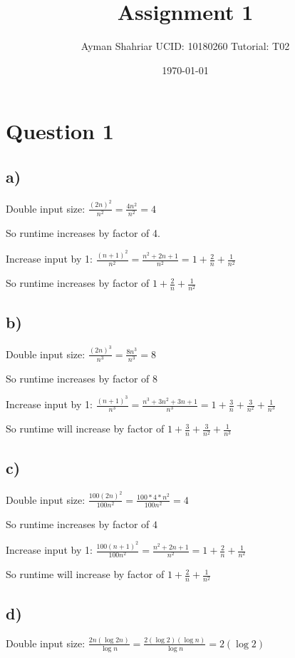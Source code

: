 \documentclass{article}
\title{Assignment 1}
\author{Ayman Shahriar \;\; UCID: 10180260 \;\;  Tutorial: T02 }
\date{\today}
\begin{document}
\maketitle

\raggedright

\setlength{\parskip}{0.8em}  %

\section*{Question 1}

\subsection*{a)}
Double input size: $\frac{(2n)^2}{n^2} = \frac{4n^2}{n^2} = 4$

So runtime increases by factor of 4.

Increase input by 1: $\frac{(n+1)^2}{n^2} = \frac{n^2+2n+1}{n^2} = 1+\frac{2}{n}+\frac{1}{n^2}$

So runtime increases by factor of $1+\frac{2}{n}+\frac{1}{n^2}$


\subsection*{b)}
Double input size: $\frac{(2n)^3}{n^3} = \frac{8n^3}{n^3} = 8$

So runtime increases by factor of $8$

Increase input by 1: $\frac{(n+1)^3}{n^3} = \frac{n^3+3n^2+3n+1}{n^3} = 1+\frac{3}{n} + \frac{3}{n^2} + \frac{1}{n^3}$

So runtime will increase by factor of $1+\frac{3}{n} + \frac{3}{n^2} + \frac{1}{n^3}$


\subsection*{c)}
Double input size: $\frac{100(2n)^2}{100n^2} = \frac{100*4*n^2}{100n^2} = 4$

So runtime increases by factor of $4$

Increase input by 1: $\frac{100(n+1)^2}{100n^2} = \frac{n^2+2n+1}{n^2} = 1+ \frac{2}{n} + \frac{1}{n^2}$

So runtime will increase by factor of $1+ \frac{2}{n} + \frac{1}{n^2}$



\subsection*{d)}
Double input size: $\frac{2n(\log2n)}{\log n} = \frac{2 (\log 2) (\log n)}{\log n} = 2 (\log 2)$
\end{document}
